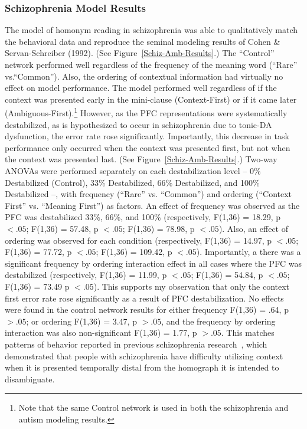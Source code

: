 \subsubsection{Schizophrenia Model Results}
The model of homonym reading in schizophrenia was able to qualitatively match the behavioral data and reproduce the seminal modeling results of Cohen \& Servan-Schreiber (1992). (See Figure~\ref{Schiz-Amb-Results}.)  The ``Control'' network performed well regardless of the frequency of the meaning word (``Rare'' vs.``Common'').   Also, the ordering of contextual information had virtually no effect on model performance.  The model performed well regardless of if the context was presented early in the mini-clause (Context-First) or if it came later (Ambiguous-First).\footnote{Note that the same Control network is used in both the schizophrenia and autism modeling results.}  However, as the PFC representations were systematically destabilized, as is hypothesized to occur in schizophrenia due to tonic-DA dysfunction, the error rate rose significantly. Importantly, this decrease in task performance only occurred when the context was presented first, but not when the context was presented last.  (See Figure~\ref{Schiz-Amb-Results}.)  Two-way ANOVAs were performed separately on each destabilization level -- 0\% Destabilized (Control), 33\% Destabilized, 66\% Destabilized, and 100\% Destabilized --, with frequency (``Rare'' vs. ``Common'') and ordering (``Context First'' vs. ``Meaning First'') as factors.  An effect of frequency was observed as the PFC was destabilized 33\%, 66\%, and 100\% (respectively, F(1,36) = 18.29, p $< .05$; F(1,36) = 57.48, p $< .05$; F(1,36) = 78.98, p $< .05$).  Also, an effect of ordering was observed for each condition (respectively, F(1,36) = 14.97, p $< .05$; F(1,36) = 77.72, p $< .05$; F(1,36) = 109.42, p $< .05$). Importantly, a there was a significant frequency by ordering interaction effect in all cases where the PFC was destabilized (respectively, F(1,36) = 11.99, p $< .05$; F(1,36) = 54.84, p $< .05$; F(1,36) = 73.49 p $< .05$).  This supports my observation that only the context first error rate rose significantly as a result of PFC destabilization. No effects were found in the control network results for either frequency F(1,36) = .64, p $>.05$; or ordering F(1,36) = 3.47, p $>.05$, and the frequency by ordering interaction was also non-significant F(1,36) = 1.77, p $>.05$.  This matches patterns of behavior reported in previous schizophrenia research~\cite{CohenJD:1992:Schizophrenia}, which demonstrated that people with schizophrenia have difficulty utilizing context when it is presented temporally distal from the homograph it is intended to disambiguate.    


